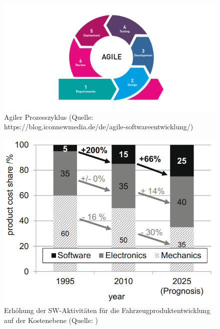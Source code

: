 \begin{figure}[htb]
	\centering
	\includegraphics[width=\textwidth]{img/agile_cycle.png}
	\caption[Agiler Prozesszyklus (Quelle: https://blog.iconnewmedia.de/de/agile-softwareentwicklung/)]{Agiler Prozesszyklus (Quelle: https://blog.iconnewmedia.de/de/agile-softwareentwicklung/)}
	\label{fig:agile}
\end{figure}

\begin{figure}[htb]
	\centering
	\includegraphics[width=\textwidth]{img/sw-activities-costs.png}
	\caption[Erhöhung der SW-Aktivitäten für die Fahrzeugproduktentwicklung auf der Kostenebene (Quelle: \cite{Schlosser2016})]{Erhöhung der SW-Aktivitäten für die Fahrzeugproduktentwicklung auf der Kostenebene (Quelle: \cite{Schlosser2016})}
	\label{fig:swSosts}
\end{figure}